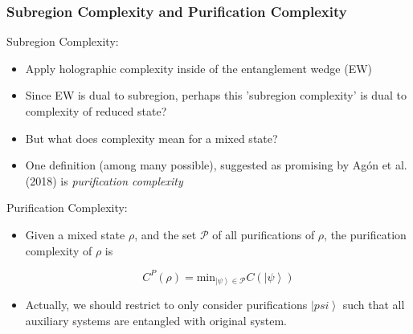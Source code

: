 \documentclass[10pt,aspectratio=169]{beamer}
\newcommand{\ket}[1]{\left| #1 \right>}
\begin{document}
\begin{frame}
\frametitle{Subregion Complexity and Purification Complexity}

Subregion Complexity:

\begin{itemize}

\item Apply holographic complexity inside of the entanglement wedge (EW)

\item Since EW is dual to subregion, perhaps this 'subregion complexity' is dual to complexity of reduced state?

\item But what does complexity mean for a mixed state?

\item One definition (among many possible), suggested as promising by Ag\'on et al. (2018) is {\it purification complexity}

\end{itemize}

Purification Complexity:

\begin{itemize}

\item Given a mixed state $\rho$, and the set $\mathcal{P}$ of all purifications of $\rho$, the purification complexity of $\rho$ is 

$$C^P(\rho) = \text{min}_{\ket{\psi}\in \mathcal{P}} C(\ket{\psi})$$

\item Actually, we should restrict to only consider purifications $\ket{psi}$ such that all auxiliary systems are entangled with original system.

\end{itemize}

\end{frame}
\end{document}
